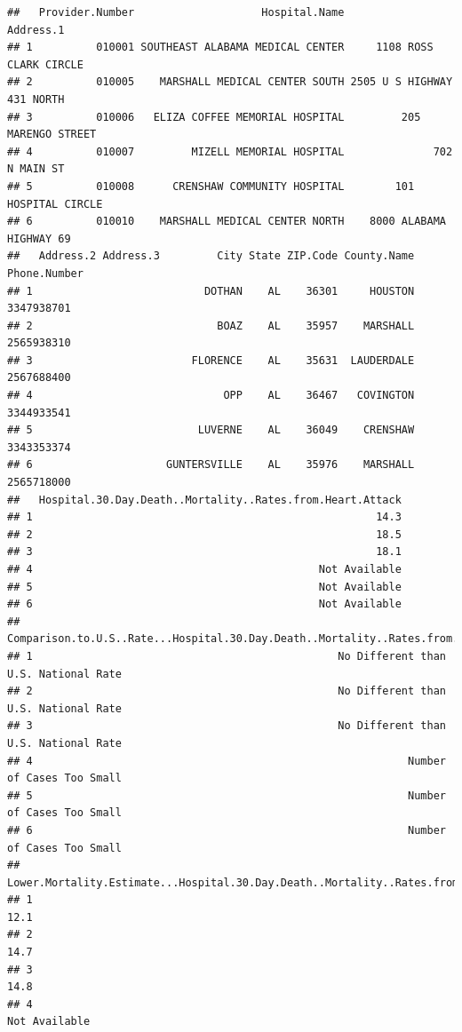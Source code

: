 \documentclass[
]{article}
\begin{document}
\begin{verbatim}
##   Provider.Number                    Hospital.Name                  Address.1
## 1          010001 SOUTHEAST ALABAMA MEDICAL CENTER     1108 ROSS CLARK CIRCLE
## 2          010005    MARSHALL MEDICAL CENTER SOUTH 2505 U S HIGHWAY 431 NORTH
## 3          010006   ELIZA COFFEE MEMORIAL HOSPITAL         205 MARENGO STREET
## 4          010007         MIZELL MEMORIAL HOSPITAL              702 N MAIN ST
## 5          010008      CRENSHAW COMMUNITY HOSPITAL        101 HOSPITAL CIRCLE
## 6          010010    MARSHALL MEDICAL CENTER NORTH    8000 ALABAMA HIGHWAY 69
##   Address.2 Address.3         City State ZIP.Code County.Name Phone.Number
## 1                           DOTHAN    AL    36301     HOUSTON   3347938701
## 2                             BOAZ    AL    35957    MARSHALL   2565938310
## 3                         FLORENCE    AL    35631  LAUDERDALE   2567688400
## 4                              OPP    AL    36467   COVINGTON   3344933541
## 5                          LUVERNE    AL    36049    CRENSHAW   3343353374
## 6                     GUNTERSVILLE    AL    35976    MARSHALL   2565718000
##   Hospital.30.Day.Death..Mortality..Rates.from.Heart.Attack
## 1                                                      14.3
## 2                                                      18.5
## 3                                                      18.1
## 4                                             Not Available
## 5                                             Not Available
## 6                                             Not Available
##   Comparison.to.U.S..Rate...Hospital.30.Day.Death..Mortality..Rates.from.Heart.Attack
## 1                                                No Different than U.S. National Rate
## 2                                                No Different than U.S. National Rate
## 3                                                No Different than U.S. National Rate
## 4                                                           Number of Cases Too Small
## 5                                                           Number of Cases Too Small
## 6                                                           Number of Cases Too Small
##   Lower.Mortality.Estimate...Hospital.30.Day.Death..Mortality..Rates.from.Heart.Attack
## 1                                                                                 12.1
## 2                                                                                 14.7
## 3                                                                                 14.8
## 4                                                                        Not Available

\end{verbatim}
\end{document}
